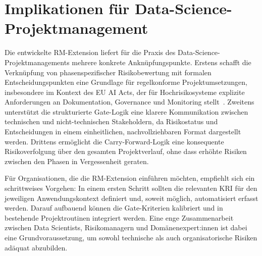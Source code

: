 \section{Implikationen für Data-Science-Projektmanagement}

Die entwickelte RM-Extension liefert für die Praxis des Data-Science-Projektmanagements 
mehrere konkrete Anknüpfungspunkte. Erstens schafft die Verknüpfung von 
phasenspezifischer Risikobewertung mit formalen Entscheidungspunkten eine 
Grundlage für regelkonforme Projektumsetzungen, insbesondere im Kontext des 
EU AI Acts, der für Hochrisikosysteme explizite Anforderungen an Dokumentation, 
Governance und Monitoring stellt~\cite{EUAIAct2024}. Zweitens unterstützt die 
strukturierte Gate-Logik eine klarere Kommunikation zwischen technischen und 
nicht-technischen Stakeholdern, da Risikostatus und Entscheidungen in einem 
einheitlichen, nachvollziehbaren Format dargestellt werden. Drittens ermöglicht 
die Carry-Forward-Logik eine konsequente Risikoverfolgung über den gesamten 
Projektverlauf, ohne dass erhöhte Risiken zwischen den Phasen in Vergessenheit 
geraten.

Für Organisationen, die die RM-Extension einführen möchten, empfiehlt sich ein 
schrittweises Vorgehen: In einem ersten Schritt sollten die relevanten KRI für 
den jeweiligen Anwendungskontext definiert und, soweit möglich, automatisiert 
erfasst werden. Darauf aufbauend können die Gate-Kriterien kalibriert und in 
bestehende Projektroutinen integriert werden. Eine enge Zusammenarbeit zwischen 
Data Scientists, Risikomanagern und Domänenexpert:innen ist dabei eine 
Grundvoraussetzung, um sowohl technische als auch organisatorische Risiken 
adäquat abzubilden.

